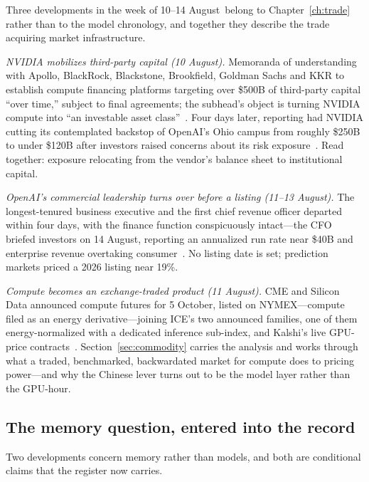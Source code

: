 Three developments in the week of 10--14 August\ belong to Chapter~\ref{ch:trade} rather than to the model chronology, and together they describe the trade acquiring market infrastructure.

\emph{NVIDIA mobilizes third-party capital (10 August).} Memoranda of understanding with Apollo, BlackRock, Blackstone, Brookfield, Goldman Sachs and KKR to establish compute financing platforms targeting over \$500B of third-party capital ``over time,'' subject to final agreements; the subhead's object is turning NVIDIA compute into ``an investable asset class''~\cite{nvda-500b}. Four days later, reporting had NVIDIA cutting its contemplated backstop of OpenAI's Ohio campus from roughly \$250B to under \$120B after investors raised concerns about its risk exposure~\cite{nvidia-backstop-cut}. Read together: exposure relocating from the vendor's balance sheet to institutional capital.

\emph{OpenAI's commercial leadership turns over before a listing (11--13 August).} The longest-tenured business executive and the first chief revenue officer departed within four days, with the finance function conspicuously intact---the CFO briefed investors on 14 August, reporting an annualized run rate near \$40B and enterprise revenue overtaking consumer~\cite{openai-exits}. No listing date is set; prediction markets priced a 2026 listing near 19\%.

\emph{Compute becomes an exchange-traded product (11 August).} CME and Silicon Data announced compute futures for 5 October, listed on NYMEX---compute filed as an energy derivative---joining ICE's two announced families, one of them energy-normalized with a dedicated inference sub-index, and Kalshi's live GPU-price contracts~\cite{cme-compute,ice-nativx,kalshi-compute}. Section~\ref{sec:commodity} carries the analysis and works through what a traded, benchmarked, backwardated market for compute does to pricing power---and why the Chinese lever turns out to be the model layer rather than the GPU-hour.

\subsection{The memory question, entered into the record}

Two developments concern memory rather than models, and both are conditional claims that the register now carries.

